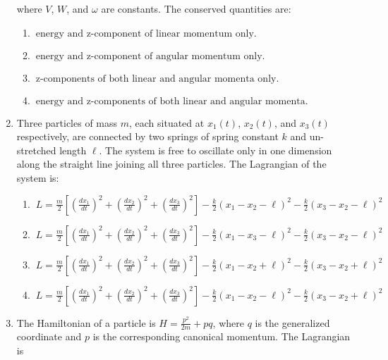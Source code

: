 \documentclass[journal]{IEEEtran}
\begin{document}
\begin{enumerate}
where \( V \), \( W \), and \( \omega \) are constants. The conserved quantities are:
\begin{enumerate}
\item $\ \text{energy and z-component of linear momentum only.}$
\item $ \ \text{energy and z-component of angular momentum only.} $
\item $\ \text{z-components of both linear and angular momenta only.} $
\item $\ \text{energy and z-components of both linear and angular momenta.}$
\end{enumerate}
\newpage 
\item Three particles of mass \( m \), each situated at \( x_1(t) \), \( x_2(t) \), and \( x_3(t) \) respectively, are connected by two springs of spring constant \( k \) and un-stretched length \( \ell \). The system is free to oscillate only in one dimension along the straight line joining all three particles. The Lagrangian of the system is:
\begin{enumerate}
\item $ \ L = \frac{m}{2} \left[ \left( \frac{dx_1}{dt} \right)^2 + \left( \frac{dx_2}{dt} \right)^2 + \left( \frac{dx_3}{dt} \right)^2 \right] - \frac{k}{2} (x_1 - x_2 - \ell)^2 - \frac{k}{2} (x_3 - x_2 - \ell)^2$
\item $ \ L = \frac{m}{2} \left[ \left( \frac{dx_1}{dt} \right)^2 + \left( \frac{dx_2}{dt} \right)^2 + \left( \frac{dx_3}{dt} \right)^2 \right] - \frac{k}{2} (x_1 - x_3 - \ell)^2 - \frac{k}{2} (x_3 - x_2 - \ell)^2$
\item $ \ L = \frac{m}{2} \left[ \left( \frac{dx_1}{dt} \right)^2 + \left( \frac{dx_2}{dt} \right)^2 + \left( \frac{dx_3}{dt} \right)^2 \right] - \frac{k}{2} (x_1 - x_2 + \ell)^2 - \frac{k}{2} (x_3 - x_2 + \ell)^2$
\item $ \ L = \frac{m}{2} \left[ \left( \frac{dx_1}{dt} \right)^2 + \left( \frac{dx_2}{dt} \right)^2 + \left( \frac{dx_3}{dt} \right)^2 \right] - \frac{k}{2} (x_1 - x_2 - \ell)^2 - \frac{k}{2} (x_3 - x_2 + \ell)^2$
\end{enumerate}
\newpage
\item The Hamiltonian of a particle is \( H = \frac{p^2}{2m} + pq \), where  $q$ is the generalized coordinate and  $p$  is the corresponding canonical momentum. The Lagrangian is


\end{enumerate}
\end{document}
